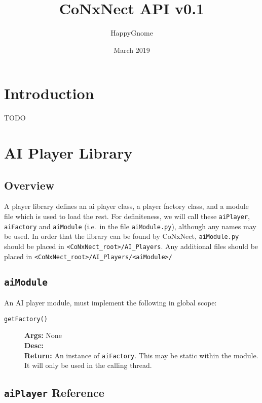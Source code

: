 \documentclass[a4paper,11pt]{article}
\title{CoNxNect API v0.1}
\author{HappyGnome}
\date{March 2019}
\newcommand{\MethodItem}[4]{\item[{\tt #1}]{\bf Args: }#2\\{\bf Desc: }#3\\{\bf Return: }#4}
\begin{document}
\maketitle
\tableofcontents
\section{Introduction}
TODO
\section{AI Player Library}
\subsection{Overview}
A player library defines an ai player class, a player factory class, and a module file which is used to load the rest. For definiteness, we will call these {\tt aiPlayer}, {\tt aiFactory} and {\tt aiModule} (i.e.\ in the file {\tt aiModule.py}), although any names may be used. In order that the library can be found by CoNxNect, {\tt aiModule.py} should be placed in {\tt <CoNxNect\_root>/AI\_Players}. Any additional files should be placed in {\tt <CoNxNect\_root>/AI\_Players/<aiModule>/}
\subsection{\tt aiModule}
An AI player module, must implement the following in global scope:
\begin{description}
\MethodItem{getFactory()}{None}{}{An instance of {\tt aiFactory}. This may be static within the module. It will only be used in the calling thread.}
\end{description}
\subsection{{\tt aiPlayer} Reference}
\end{document}
